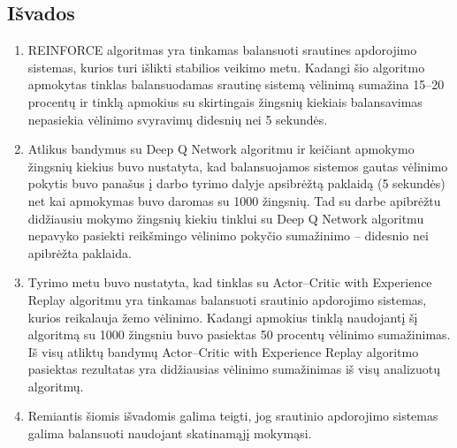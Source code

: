 \documentclass{VUMIFPSbakalaurinis}
\begin{document}
\subsection*{Išvados}

\begin{enumerate}
    \item REINFORCE algoritmas yra tinkamas balansuoti srautines apdorojimo sistemas, kurios turi išlikti stabilios veikimo metu. Kadangi šio algoritmo apmokytas tinklas balansuodamas srautinę sistemą vėlinimą sumažina 15–20 procentų ir tinklą apmokius su skirtingais žingsnių kiekiais balansavimas nepasiekia vėlinimo svyravimų didesnių nei 5 sekundės. 
    \item Atlikus bandymus su Deep Q Network algoritmu ir keičiant apmokymo žingsnių kiekius buvo nustatyta, kad balansuojamos sistemos gautas vėlinimo pokytis buvo panašus į darbo tyrimo dalyje apsibrėžtą paklaidą (5 sekundės) net kai apmokymas buvo daromas su 1000 žingsnių. Tad su darbe apibrėžtu didžiausiu mokymo žingsnių kiekiu tinklui su Deep Q Network algoritmu nepavyko pasiekti reikšmingo vėlinimo pokyčio sumažinimo – didesnio nei apibrėžta paklaida. 
    \item Tyrimo metu buvo nustatyta, kad tinklas su Actor–Critic with Experience Replay algoritmu yra tinkamas balansuoti  srautinio apdorojimo sistemas, kurios reikalauja žemo vėlinimo. Kadangi apmokius tinklą naudojantį šį algoritmą su 1000 žingsniu buvo pasiektas 50 procentų vėlinimo sumažinimas. Iš visų atliktų bandymų Actor–Critic with Experience Replay algoritmo pasiektas rezultatas yra didžiausias vėlinimo sumažinimas iš visų analizuotų algoritmų.
    \item Remiantis šiomis išvadomis galima teigti, jog srautinio apdorojimo sistemas galima balansuoti naudojant skatinamąjį mokymąsi.
\end{enumerate}

\printbibliography[heading=bibintoc] 

\appendix
\end{document}
